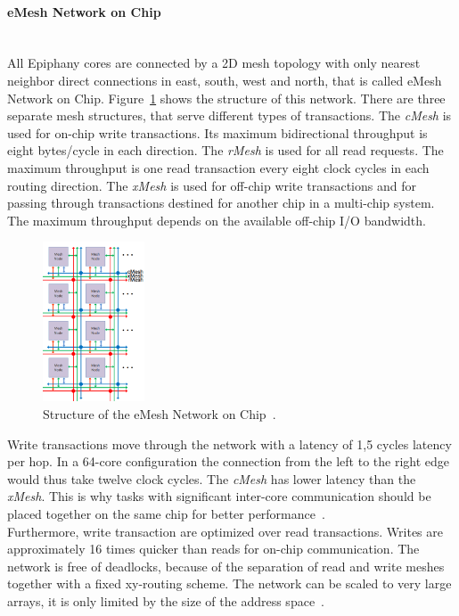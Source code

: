 \documentclass[american, hauptseminar, twoside]{zihpub}
\begin{document}
				\paragraph{eMesh Network on Chip}\mbox{}\\
					All Epiphany cores are connected by a 2D mesh topology with only nearest neighbor direct connections in east, south, west and north, that is called eMesh Network on Chip. Figure~\ref{fig:emesh} shows the structure of this network. There are three separate mesh structures, that serve different types of transactions. The \textit{cMesh} is used for on-chip write transactions. Its maximum bidirectional throughput is eight bytes/cycle in each direction. The \textit{rMesh} is used for all read requests. The maximum throughput is one read transaction every eight clock cycles in each routing direction. The \textit{xMesh} is used for off-chip write transactions and for passing through transactions destined for another chip in a multi-chip system. The maximum throughput depends on the available off-chip I/O bandwidth.
					\begin{figure}[h]
						\begin{center}
							\includegraphics[width=0.27\textwidth]{grafiken/emesh.png}
							\caption{Structure of the eMesh Network on Chip~\cite{Adaptev2011}.}
							\label{fig:emesh}
						\end{center}
					\end{figure}
					Write transactions move through the network with a latency of 1,5 cycles latency per hop. In a 64-core configuration the connection from the left to the right edge would thus take twelve clock cycles. The \textit{cMesh} has lower latency than the \textit{xMesh}. This is why tasks with significant inter-core communication should be placed together on the same chip for better performance~\cite{Adaptev2011}.
					\\
					Furthermore, write transaction are optimized over read transactions. Writes are approximately 16 times quicker than reads for on-chip communication. The network is free of deadlocks, because of the separation of read and write meshes together with a fixed xy-routing scheme. The network can be scaled to very large arrays, it is only limited by the size of the address space~\cite{Adaptev2011}.
					
\end{document}

